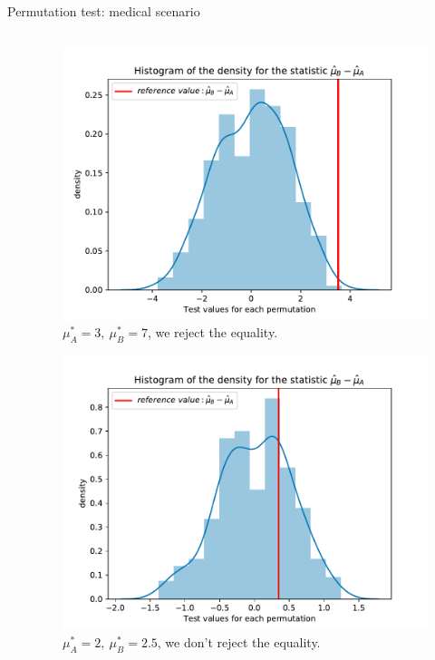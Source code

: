 \documentclass[unknownkeysallowed]{beamer}
\begin{document}
\begin{frame}{Permutation test: medical scenario}
\begin{columns}
\begin{column}[T]{.48\textwidth}
\begin{itemize}
\end{itemize}
\end{column}
\begin{column}[T]{.48\textwidth}
\vspace{-.35cm}
	\begin{figure}[!tbp]
    \includegraphics[width=\textwidth, clip, trim={0cm 0.2cm 0cm .5cm}]{rejet.pdf}
    \caption{\tiny{$\mu_A^*=3,\ \mu_B^*=7$, we reject the equality.}}
\end{figure}
\vspace{-.45cm}
\begin{figure}
    \includegraphics[width=\textwidth, clip, trim={0cm 0.2cm 0cm .5cm}]{not_rejet.pdf}
    \caption{\tiny{$\mu_A^*=2, \ \mu_B^*=2.5$, we don't reject the equality.}}
\end{figure}
	
\end{column}
\end{columns}
\end{frame}
\end{document}
